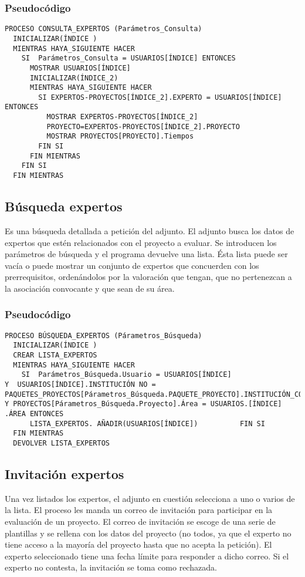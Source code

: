 \documentclass[12pt,a4paper,spanish,twoside]{book}
\begin{document}
\subsubsection{Pseudocódigo}
\begin{lstlisting}[inputencoding=utf8/latin1]
PROCESO CONSULTA_EXPERTOS (Parámetros_Consulta)
  INICIALIZAR(ÍNDICE )
  MIENTRAS HAYA_SIGUIENTE HACER
    SI  Parámetros_Consulta = USUARIOS[ÍNDICE] ENTONCES
      MOSTRAR USUARIOS[ÍNDICE]
      INICIALIZAR(ÍNDICE_2)
      MIENTRAS HAYA_SIGUIENTE HACER
        SI EXPERTOS-PROYECTOS[ÍNDICE_2].EXPERTO = USUARIOS[ÍNDICE] ENTONCES
          MOSTRAR EXPERTOS-PROYECTOS[ÍNDICE_2]
          PROYECTO=EXPERTOS-PROYECTOS[ÍNDICE_2].PROYECTO
          MOSTRAR PROYECTOS[PROYECTO].Tiempos
        FIN SI
      FIN MIENTRAS
    FIN SI
  FIN MIENTRAS

\end{lstlisting}

\subsection{Búsqueda expertos}
Es una búsqueda detallada a petición del adjunto. El adjunto busca los datos de 
expertos que estén relacionados con el proyecto a evaluar. Se introducen los 
parámetros de búsqueda y el programa devuelve una lista. Ésta lista puede ser 
vacía o puede mostrar un conjunto de expertos que concuerden con los 
prerrequisitos, ordenándolos por la valoración que tengan, que no pertenezcan a 
la asociación convocante y que sean de su área.

\subsubsection{Pseudocódigo}
\begin{lstlisting}[inputencoding=utf8/latin1]
PROCESO BÚSQUEDA_EXPERTOS (Párametros_Búsqueda)
  INICIALIZAR(ÍNDICE )
  CREAR LISTA_EXPERTOS
  MIENTRAS HAYA_SIGUIENTE HACER
    SI  Parámetros_Búsqueda.Usuario = USUARIOS[ÍNDICE] 
Y  USUARIOS[ÍNDICE].INSTITUCIÓN NO = PAQUETES_PROYECTOS[Párametros_Búsqueda.PAQUETE_PROYECTO].INSTITUCIÓN_CONVOCANTE 
Y PROYECTOS[Párametros_Búsqueda.Proyecto].Área = USUARIOS.[ÍNDICE] .ÁREA ENTONCES 
      LISTA_EXPERTOS. AÑADIR(USUARIOS[ÍNDICE])          FIN SI
  FIN MIENTRAS
  DEVOLVER LISTA_EXPERTOS  

\end{lstlisting}

\subsection{Invitación expertos}
Una vez listados los expertos, el adjunto en cuestión selecciona a uno o varios 
de la lista. El proceso les manda un correo de invitación para participar en la 
evaluación de un proyecto. El correo de invitación se escoge de una serie de 
plantillas y se rellena con los datos del proyecto (no todos, ya que el experto 
no tiene acceso a la mayoría del proyecto hasta que no acepta la petición). El 
experto seleccionado tiene una fecha límite para responder a dicho correo. Si el
experto no contesta, la invitación se toma como rechazada.
\end{document}
